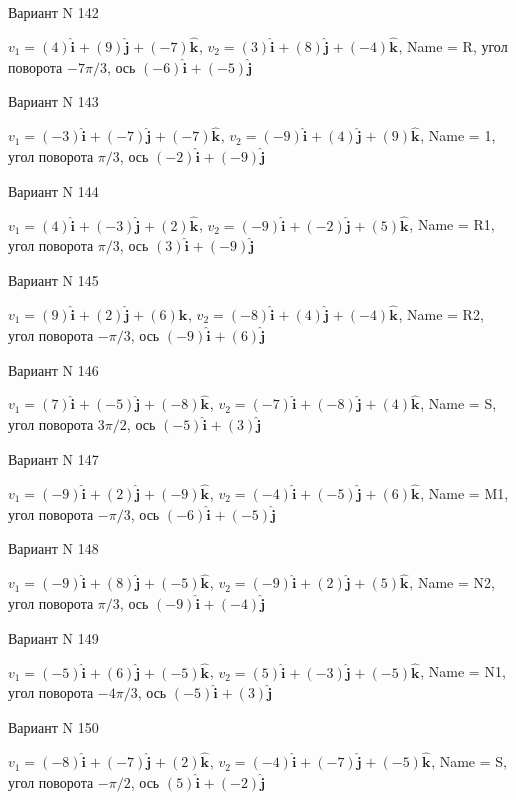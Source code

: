 \documentclass[11pt]{report}
\begin{document}
Вариант N 142

$v_1 = (4)\mathbf{\hat{i}_{}} + (9)\mathbf{\hat{j}_{}} + (-7)\mathbf{\hat{k}_{}}$, $v_2 = (3)\mathbf{\hat{i}_{}} + (8)\mathbf{\hat{j}_{}} + (-4)\mathbf{\hat{k}_{}}$, Name = R, угол поворота $- 7 \pi / 3$, ось $(-6)\mathbf{\hat{i}_{}} + (-5)\mathbf{\hat{j}_{}}$

Вариант N 143

$v_1 = (-3)\mathbf{\hat{i}_{}} + (-7)\mathbf{\hat{j}_{}} + (-7)\mathbf{\hat{k}_{}}$, $v_2 = (-9)\mathbf{\hat{i}_{}} + (4)\mathbf{\hat{j}_{}} + (9)\mathbf{\hat{k}_{}}$, Name = 1, угол поворота $\pi / 3$, ось $(-2)\mathbf{\hat{i}_{}} + (-9)\mathbf{\hat{j}_{}}$

Вариант N 144

$v_1 = (4)\mathbf{\hat{i}_{}} + (-3)\mathbf{\hat{j}_{}} + (2)\mathbf{\hat{k}_{}}$, $v_2 = (-9)\mathbf{\hat{i}_{}} + (-2)\mathbf{\hat{j}_{}} + (5)\mathbf{\hat{k}_{}}$, Name = R1, угол поворота $\pi / 3$, ось $(3)\mathbf{\hat{i}_{}} + (-9)\mathbf{\hat{j}_{}}$

Вариант N 145

$v_1 = (9)\mathbf{\hat{i}_{}} + (2)\mathbf{\hat{j}_{}} + (6)\mathbf{\hat{k}_{}}$, $v_2 = (-8)\mathbf{\hat{i}_{}} + (4)\mathbf{\hat{j}_{}} + (-4)\mathbf{\hat{k}_{}}$, Name = R2, угол поворота $- \pi / 3$, ось $(-9)\mathbf{\hat{i}_{}} + (6)\mathbf{\hat{j}_{}}$

Вариант N 146

$v_1 = (7)\mathbf{\hat{i}_{}} + (-5)\mathbf{\hat{j}_{}} + (-8)\mathbf{\hat{k}_{}}$, $v_2 = (-7)\mathbf{\hat{i}_{}} + (-8)\mathbf{\hat{j}_{}} + (4)\mathbf{\hat{k}_{}}$, Name = S, угол поворота $3 \pi / 2$, ось $(-5)\mathbf{\hat{i}_{}} + (3)\mathbf{\hat{j}_{}}$

Вариант N 147

$v_1 = (-9)\mathbf{\hat{i}_{}} + (2)\mathbf{\hat{j}_{}} + (-9)\mathbf{\hat{k}_{}}$, $v_2 = (-4)\mathbf{\hat{i}_{}} + (-5)\mathbf{\hat{j}_{}} + (6)\mathbf{\hat{k}_{}}$, Name = M1, угол поворота $- \pi / 3$, ось $(-6)\mathbf{\hat{i}_{}} + (-5)\mathbf{\hat{j}_{}}$

Вариант N 148

$v_1 = (-9)\mathbf{\hat{i}_{}} + (8)\mathbf{\hat{j}_{}} + (-5)\mathbf{\hat{k}_{}}$, $v_2 = (-9)\mathbf{\hat{i}_{}} + (2)\mathbf{\hat{j}_{}} + (5)\mathbf{\hat{k}_{}}$, Name = N2, угол поворота $\pi / 3$, ось $(-9)\mathbf{\hat{i}_{}} + (-4)\mathbf{\hat{j}_{}}$

Вариант N 149

$v_1 = (-5)\mathbf{\hat{i}_{}} + (6)\mathbf{\hat{j}_{}} + (-5)\mathbf{\hat{k}_{}}$, $v_2 = (5)\mathbf{\hat{i}_{}} + (-3)\mathbf{\hat{j}_{}} + (-5)\mathbf{\hat{k}_{}}$, Name = N1, угол поворота $- 4 \pi / 3$, ось $(-5)\mathbf{\hat{i}_{}} + (3)\mathbf{\hat{j}_{}}$

Вариант N 150

$v_1 = (-8)\mathbf{\hat{i}_{}} + (-7)\mathbf{\hat{j}_{}} + (2)\mathbf{\hat{k}_{}}$, $v_2 = (-4)\mathbf{\hat{i}_{}} + (-7)\mathbf{\hat{j}_{}} + (-5)\mathbf{\hat{k}_{}}$, Name = S, угол поворота $- \pi / 2$, ось $(5)\mathbf{\hat{i}_{}} + (-2)\mathbf{\hat{j}_{}}$
\end{document}
